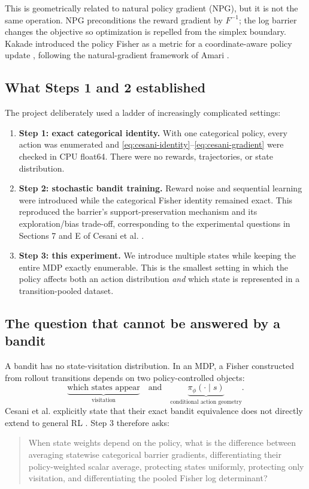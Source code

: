 \documentclass[10pt,a4paper]{article}
\begin{document}
This is geometrically related to natural policy gradient (NPG), but it is not
the same operation.  NPG preconditions the reward gradient by $F^{-1}$;
the log barrier changes the objective so optimization is repelled from the
simplex boundary.  Kakade introduced the policy Fisher as a metric for a
coordinate-aware policy update \cite{Kakade2001}, following the natural-gradient
framework of Amari \cite{Amari1998}.

\subsection{What Steps 1 and 2 established}

The project deliberately used a ladder of increasingly complicated settings:
\begin{enumerate}
\item \textbf{Step 1: exact categorical identity.}  With one categorical
policy, every action was enumerated and
\eqref{eq:cesani-identity}--\eqref{eq:cesani-gradient} were checked in CPU
float64.  There were no rewards, trajectories, or state distribution.
\item \textbf{Step 2: stochastic bandit training.}  Reward noise and sequential
learning were introduced while the categorical Fisher identity remained exact.
This reproduced the barrier's support-preservation mechanism and its
exploration/bias trade-off, corresponding to the experimental questions in
Sections 7 and E of Cesani et al. \cite{cesani2026}.
\item \textbf{Step 3: this experiment.}  We introduce multiple states while
keeping the entire MDP exactly enumerable.  This is the smallest setting in
which the policy affects both an action distribution \emph{and} which state is
represented in a transition-pooled dataset.
\end{enumerate}

\subsection{The question that cannot be answered by a bandit}

A bandit has no state-visitation distribution.  In an MDP, a Fisher constructed
from rollout transitions depends on two policy-controlled objects:
\begin{equation}
\underbrace{\text{which states appear}}_{\text{visitation}}
\quad\text{and}\quad
\underbrace{\pi_\phi(\cdot\mid s)}_{\text{conditional action geometry}}.
\end{equation}
Cesani et al. explicitly state that their exact bandit equivalence does not
directly extend to general RL \cite[Sec.~8]{cesani2026}.  Step 3 therefore asks:
\begin{quote}
When state weights depend on the policy, what is the difference between
averaging statewise categorical barrier gradients, differentiating their
policy-weighted scalar average, protecting states uniformly, protecting only
visitation, and differentiating the pooled Fisher log determinant?
\end{quote}
\end{document}
